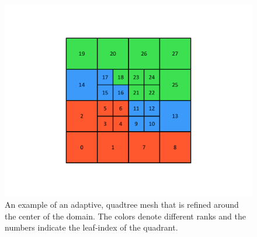 \begin{figure}
    \centering
    \includegraphics[width=\textwidth, clip=true, trim={0 100 0 100}]{figures/parallel_adaptive_mesh_indexing.pdf}
    \caption{An example of an adaptive, quadtree mesh that is refined around the center of the domain. The colors denote different ranks and the numbers indicate the leaf-index of the quadrant.}
    \label{fig:adaptive_mesh}
\end{figure}

